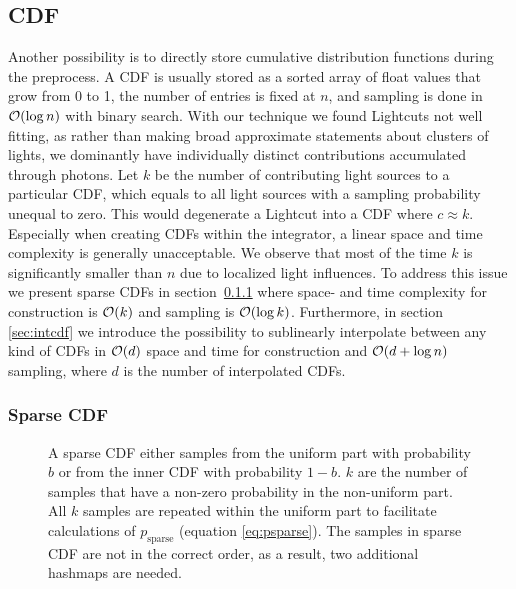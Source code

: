 \subsection{CDF}

Another possibility is to directly store cumulative distribution functions during the preprocess. A CDF is usually stored as a sorted array of float values that grow from 0 to 1, the number of entries is fixed at $n$, and sampling is done in $\mathcal{O}(\log{n})$ with binary search. With our technique we found Lightcuts not well fitting, as rather than making broad approximate statements about clusters of lights, we dominantly have individually distinct contributions accumulated through photons. Let $k$ be the number of contributing light sources to a particular CDF, which equals to all light sources with a sampling probability unequal to zero. This would degenerate a Lightcut into a CDF where $c \approx k$. Especially when creating CDFs within the integrator, a linear space and time complexity is generally unacceptable. We observe that most of the time $k$ is significantly smaller than $n$ due to localized light influences. To address this issue we present sparse CDFs in section~\ref{sec:sparse} where space- and time complexity for construction is $\mathcal{O}(k)$ and sampling is $\mathcal{O}(\log{k})$. Furthermore, in section \ref{sec:intcdf} we introduce the possibility to sublinearly interpolate between any kind of CDFs in $\mathcal{O}(d)$ space and time for construction and $\mathcal{O}(d + \log{n})$ sampling, where $d$ is the number of interpolated CDFs.

\subsubsection{Sparse CDF}
\label{sec:sparse}
\begin{figure}[htb] 
	\centering
    
    \caption{A sparse CDF either samples from the uniform part with probability $b$ or from the inner CDF with probability $1-b$. $k$ are the number of samples that have a non-zero probability in the non-uniform part. All $k$ samples are repeated within the uniform part to facilitate calculations of $p_{\text{sparse}}$ (equation \ref{eq:psparse}). The samples in sparse CDF are not in the correct order, as a result, two additional hashmaps are needed.} 
    \label{fig:sparseCDF}
\end{figure}

